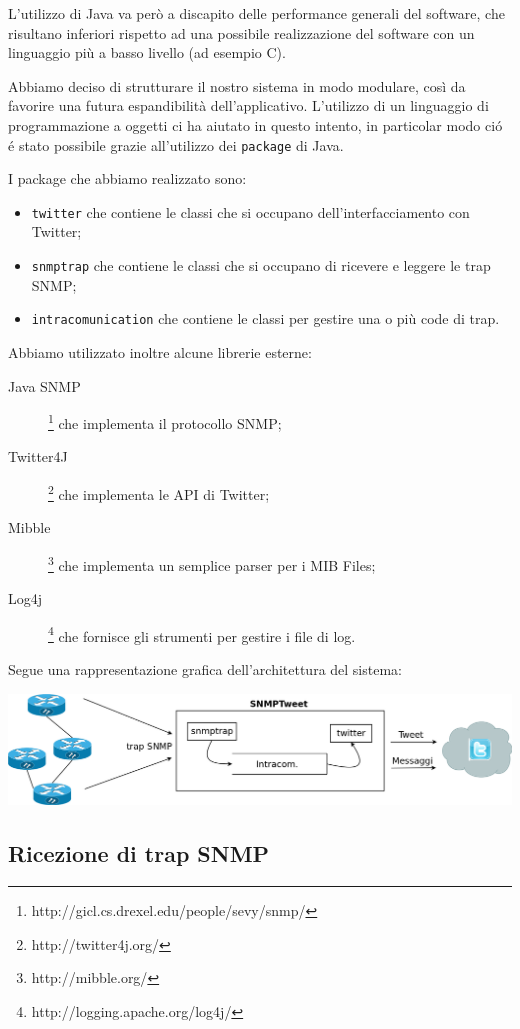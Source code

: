 \documentclass[a4paper, 10pt]{article}
\begin{document}
L'utilizzo di Java va  per\`o a discapito delle performance generali del software, che risultano inferiori rispetto ad una possibile realizzazione del software con un linguaggio pi\`u a basso livello (ad esempio C).

Abbiamo deciso di strutturare il nostro sistema in modo modulare, cos\`i da favorire una futura espandibilit\`a dell'applicativo. L'utilizzo di un linguaggio di programmazione a oggetti ci ha aiutato in questo intento, in particolar modo ci\'o \'e stato possibile grazie all'utilizzo dei \texttt{package} di Java.

I package che abbiamo realizzato sono:
\begin{itemize}
	\item \texttt{twitter} che contiene le classi che si occupano dell'interfacciamento con Twitter;
	\item \texttt{snmptrap} che contiene le classi che si occupano di ricevere e leggere le trap SNMP;
	\item \texttt{intracomunication} che contiene le classi per gestire una o pi\`u code di trap.
\end{itemize}

Abbiamo utilizzato inoltre alcune librerie esterne:
\begin{description}
	\item[Java SNMP]\footnote{http://gicl.cs.drexel.edu/people/sevy/snmp/} che implementa il protocollo SNMP;
	\item[Twitter4J]\footnote{http://twitter4j.org/} che implementa le API di Twitter;
	\item[Mibble]\footnote{http://mibble.org/} che implementa un semplice parser per i MIB Files;
	\item[Log4j]\footnote{http://logging.apache.org/log4j/} che fornisce gli strumenti per gestire i file di log.
\end{description}

Segue una rappresentazione grafica dell'architettura del sistema:
\begin{center}
\includegraphics[scale=0.20]{diagram.png}
\end{center}

\subsection{Ricezione di trap SNMP}
\end{document}
